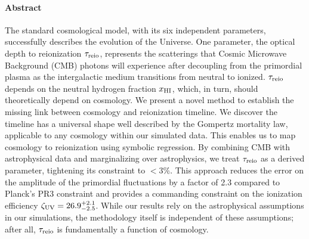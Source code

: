 \paragraph{\large Abstract}  %
The standard cosmological model, with its six independent parameters,
successfully describes the evolution of the
Universe.
One parameter, the optical depth to reionization $\tau_{\mathrm{reio}}$,
represents the scatterings that Cosmic Microwave Background (CMB)
photons will experience after decoupling from the primordial plasma as
the intergalactic medium transitions from neutral to ionized.
$\tau_{\mathrm{reio}}$ depends on the neutral hydrogen fraction $x_{\mathrm{HI}}$, which, in
turn, should theoretically depend on cosmology.
We present a novel method to establish the missing link between
cosmology and reionization timeline.
We discover the timeline has a universal shape well described by the
Gompertz mortality law, applicable to any cosmology within our simulated
data.
This enables us to map cosmology to reionization using
symbolic regression. By combining CMB with astrophysical data
and marginalizing over astrophysics, we treat $\tau_{\mathrm{reio}}$ as a derived parameter, 
tightening its constraint to $<3\%$. This approach 
reduces the error on the amplitude of the primordial fluctuations by a
factor of 2.3 compared to Planck's PR3 constraint and provides a commanding
constraint on the ionization efficiency $\zeta_\mathrm{UV} = 26.9^{+2.1}_{-2.5}$.
While our results rely on the astrophysical assumptions in our
simulations, the methodology itself is independent of these assumptions;
after all, $\tau_{\mathrm{reio}}$ is fundamentally a function of cosmology.
